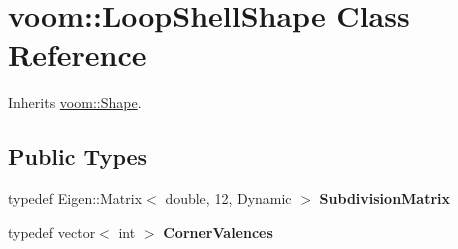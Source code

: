 \hypertarget{classvoom_1_1_loop_shell_shape}{
\section{voom::LoopShellShape Class Reference}
\label{classvoom_1_1_loop_shell_shape}
}


Inherits \hyperlink{classvoom_1_1_shape}{voom::Shape}.\subsection*{Public Types}
\begin{DoxyCompactItemize}
\item 
\hypertarget{classvoom_1_1_loop_shell_shape_a8857fd71275ca7eec38b4ba8b043fc6e}{
typedef Eigen::Matrix$<$ double, 12, Dynamic $>$ {\bfseries SubdivisionMatrix}}
\label{classvoom_1_1_loop_shell_shape_a8857fd71275ca7eec38b4ba8b043fc6e}

\item 
\hypertarget{classvoom_1_1_loop_shell_shape_a608abc79a4e3dc1a49646a1070333274}{
typedef vector$<$ int $>$ {\bfseries CornerValences}}
\label{classvoom_1_1_loop_shell_shape_a608abc79a4e3dc1a49646a1070333274}

\end{DoxyCompactItemize}
